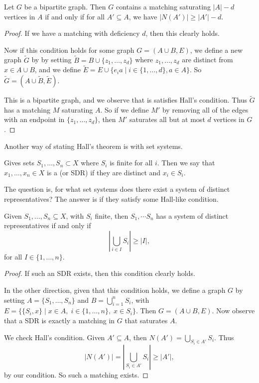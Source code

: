 \documentclass[a4paper]{scrartcl}
\begin{document}
\begin{corollary}
	Let $G$ be a bipartite graph. Then $G$ contains a matching saturating $|A|-d$ vertices in $A$ if and only if for all $A' \subseteq A$, we have $|N(A')| \geq |A'| - d$.
\end{corollary}
\begin{proof}
	If we have a matching with deficiency $d$, then this clearly holds.
	
	Now if this condition holds for some graph $G = (A\cup B, E)$, we define a new graph $\tilde{G}$ by by setting $\tilde{B} = B \cup \{z_1, \dots, z_d\}$ where $z_1, \dots, z_d$ are distinct from $x \in A \cup B$, and we define $\tilde{E} = E \cup \{e_i a \mid i \in \{1, \dots, d\}, a \in A\}$. So $\tilde{G} = (A \cup \tilde{B}, \tilde{E})$.
	
	This is a bipartite graph, and we observe that is satisfies Hall's condition. Thus $\tilde{G}$ has a matching $M$ saturating $A$. So if we define $M'$ by removing all of the edges with an endpoint in $\{z_1, \dots, z_d\}$, then $M'$ saturates all but at most $d$ vertices in $G$.
\end{proof}

Another way of stating Hall's theorem is with set systems.

\begin{definition}
Gives sets $S_1, \dots, S_n \subset X$ where $S_i$ is finite for all $i$. Then we say that $x_1, \dots, x_n \in X$ is a  (or SDR) if they are distinct and $x_i \in S_i$. 
\end{definition}

The question is, for what set systems does there exist a system of distinct representatives? The answer is if they satisfy some Hall-like condition.

\begin{corollary}
	Given $S_1, \dots, S_n \subseteq X$, with $S_i$ finite, then $S_1, \dotsm S_n$ has a system of distinct representatives if and only if
	$$
	\left|\bigcup_{i \in I} S_i\right| \geq |I|,
	 $$
	 for all $I \in \{1, \dots, n\}$.
\end{corollary}
\begin{proof}
	If such an SDR exists, then this condition clearly holds.

	In the other direction, given that this condition holds, we define a graph $G$ by setting $A = \{S_1, \dots, S_n\}$ and $B = \bigcup_{i = 1}^n S_i$, with $E = \{ \{S_i, x\} \mid x \in A,\; i \in \{1, \dots, n\}, \; x \in S_i\}$. Then $G = (A \cup B, E).$ Now observe that a SDR is exactly a matching in $G$ that saturates $A$.

	We check Hall's condition. Given $A' \subseteq A$, then $N(A') = \bigcup_{S_i \in A'} S_i$. Thus
	$$
	\left|N(A')\right| = \left|\bigcup_{S_i \in A'} S_i\right| \geq |A'|,
	$$
	by our condition. So such a matching exists.
\end{proof}
\end{document}
